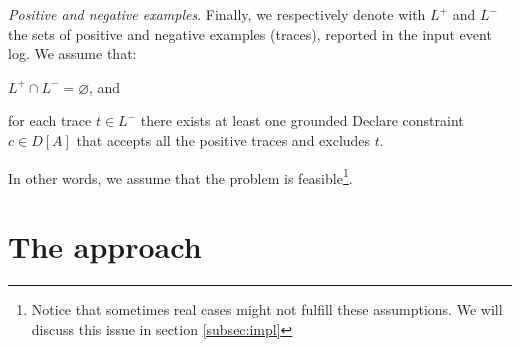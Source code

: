 \documentclass[a4wide,11pt]{article}
\theoremstyle{definition}
\theoremstyle{plain}
\newcommand\paragrafo[1]{{\smallskip \noindent \textit{#1}.}}
\begin{document}
\paragrafo{Positive and negative examples} Finally, we respectively denote with $L^+$ and $L^-$ the sets of positive and negative examples (traces), reported in the input event log. We assume that:
\begin{enumerate*}[label=(\textit{\roman*})]
\item $L^+ \cap L^- = \varnothing$, and 
\item for each trace $t \in L^-$ there exists at least one grounded Declare constraint $c \in D[A]$ that accepts all the positive traces and excludes $t$.
\end{enumerate*}
In other words, we assume that the problem is feasible\footnote{Notice that sometimes real cases might not fulfill these assumptions. We will discuss this issue in section \ref{subsec:impl}}.






\section{The approach}
\label{sec:approach}
\end{document}
